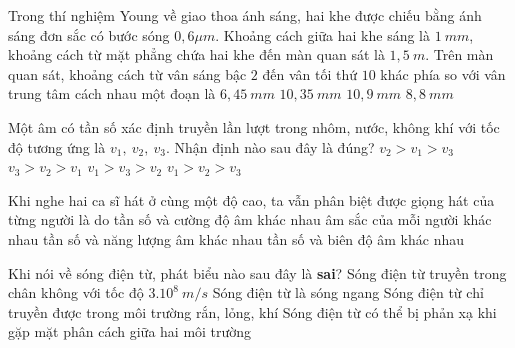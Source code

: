	\begin{ex}%
		Trong thí nghiệm Young về giao thoa ánh sáng, hai khe được chiếu bằng ánh sáng đơn sắc có bước sóng $0,6\mu m$. Khoảng cách giữa hai khe sáng là $1\ mm$, khoảng cách từ mặt phẳng chứa hai khe đến màn quan sát là $1,5\ m$. Trên màn quan sát, khoảng cách từ vân sáng bậc $2$ đến vân tối thứ $10$ khác phía so với vân trung tâm cách nhau một đoạn là
		\choice
		{$6,45\ mm$}
		{\True $10,35\ mm$}
		{$10,9\ mm$}
		{$8,8\ mm$}
	\end{ex}
	\begin{ex}%
		Một âm có tần số xác định truyền lần lượt trong nhôm, nước, không khí với tốc độ tương ứng là $v_1,\ v_2,\ v_3$. Nhận định nào sau đây là đúng?
		\choice
		{$v_2 > v_1 > v_3$}
		{$v_3 > v_2 > v_1$}
		{$v_1 > v_3 > v_2$}
		{\True $v_1 > v_2 > v_3$}
	\end{ex}
	\begin{ex}%
		Khi nghe hai ca sĩ hát ở cùng một độ cao, ta vẫn phân biệt được giọng hát của từng người là do
		\choice
		{tần số và cường độ âm khác nhau}
		{\True âm sắc của mỗi người khác nhau}
		{tần số và năng lượng âm khác nhau}
		{tần số và biên độ âm khác nhau}
	\end{ex}
	\begin{ex}
		Khi nói về sóng điện từ, phát biểu nào sau đây là \textbf{sai}?
		\choice
		{Sóng điện từ truyền trong chân không với tốc độ $3.10^8\ m/s$}
		{Sóng điện từ là sóng ngang}
		{\True Sóng điện từ chỉ truyền được trong môi trường rắn, lỏng, khí}
		{Sóng điện từ có thể bị phản xạ khi gặp mặt phân cách giữa hai môi trường}
	\end{ex}
